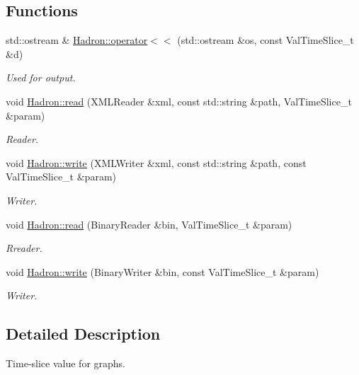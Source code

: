 \subsection*{Functions}
\begin{DoxyCompactItemize}
\item 
std\+::ostream \& \mbox{\hyperlink{namespaceHadron_ab6f642c04562e34b1b2aa6e4bcfa60e7}{Hadron\+::operator$<$$<$}} (std\+::ostream \&os, const Val\+Time\+Slice\+\_\+t \&d)
\begin{DoxyCompactList}\small\item\em Used for output. \end{DoxyCompactList}\item 
void \mbox{\hyperlink{namespaceHadron_aa4df93329eeddeec176cd9df5abe9ce1}{Hadron\+::read}} (X\+M\+L\+Reader \&xml, const std\+::string \&path, Val\+Time\+Slice\+\_\+t \&param)
\begin{DoxyCompactList}\small\item\em Reader. \end{DoxyCompactList}\item 
void \mbox{\hyperlink{namespaceHadron_ab3f6a936fc8ba9b50904aca066146f48}{Hadron\+::write}} (X\+M\+L\+Writer \&xml, const std\+::string \&path, const Val\+Time\+Slice\+\_\+t \&param)
\begin{DoxyCompactList}\small\item\em Writer. \end{DoxyCompactList}\item 
void \mbox{\hyperlink{namespaceHadron_ad59dd6905268b9fa8e1bf10fef767b9b}{Hadron\+::read}} (Binary\+Reader \&bin, Val\+Time\+Slice\+\_\+t \&param)
\begin{DoxyCompactList}\small\item\em Rreader. \end{DoxyCompactList}\item 
void \mbox{\hyperlink{namespaceHadron_a7b503b82bc88cdec19d5b7173957b35e}{Hadron\+::write}} (Binary\+Writer \&bin, const Val\+Time\+Slice\+\_\+t \&param)
\begin{DoxyCompactList}\small\item\em Writer. \end{DoxyCompactList}\end{DoxyCompactItemize}


\subsection{Detailed Description}
Time-\/slice value for graphs. 

